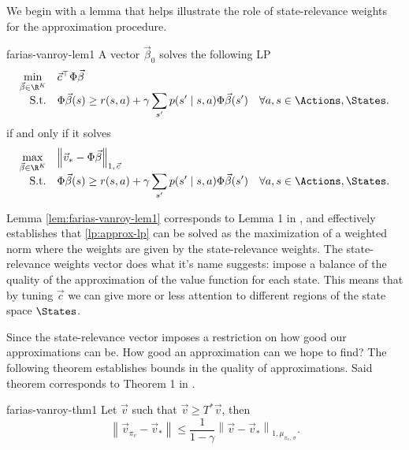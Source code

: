 We begin with a lemma that helps illustrate the role of state-relevance weights
for the approximation procedure.

\begin{lemma}{}{farias-vanroy-lem1}
    A vector $\vec{\beta}_0$ solves the following LP
    \begin{equation*}
    \begin{array}{rl@{}ll}
        \displaystyle \min_{\vec{\beta} \in \R^{K}} & \vec{c}^{\top} \Phi \vec{\beta} \\
        \text{S.t.} & \displaystyle \Phi \vec{\beta} (s) \geq r(s, a) + \gamma \sum_{s'} p(s' \mid s, a) \Phi \vec{\beta}(s') & \quad \forall a, s \in \Actions, \States . \\
    \end{array}
    \end{equation*}
    if and only if it solves
    \begin{equation*}
    \begin{array}{rl@{}ll}
        \displaystyle \max_{\vec{\beta} \in \R^{K}} & \left\| \vec{v}_* - \Phi \vec{\beta} \right\|_{1, \, \vec{c}} \\
        \text{S.t.} & \displaystyle \Phi \vec{\beta} (s) \geq r(s, a) + \gamma \sum_{s'} p(s' \mid s, a) \Phi \vec{\beta}(s') & \quad \forall a, s \in \Actions, \States . \\
    \end{array}
    \end{equation*}
\end{lemma}

Lemma \ref{lem:farias-vanroy-lem1} corresponds to Lemma 1 in
\Cite[pg.~853]{farias2003LP2ADP}, and effectively establishes that
\eqref{lp:approx-lp} can be solved as the maximization of a weighted norm where
the weights are given by the state-relevance weights. The state-relevance
weights vector does what it's name suggests: impose a balance of the quality of
the approximation of the value function for each state. This means that by
tuning $\vec{c}$ we can give more or less attention to different regions of the
state space $\States$.

Since the state-relevance vector imposes a restriction on how good our
approximations can be. How good an approximation can we hope to find? The
following theorem establishes bounds in the quality of approximations. Said
theorem corresponds to Theorem 1 in \Cite[pg.~853]{farias2003LP2ADP}.

\begin{thrm}{}{farias-vanroy-thm1}
    Let $\vec{v}$ such that $\vec{v} \geq T^{*} \vec{v}$, then
    \begin{equation*}
       \left\| \vec{v}_{\pi_v} - \vec{v}_* \right\| \leq \frac{1}{1 - \gamma} \left\| \vec{v}  - \vec{v}_* \right\|_{1, \mu_{\pi_v, \, \sigma}}.
    \end{equation*}
\end{thrm}

